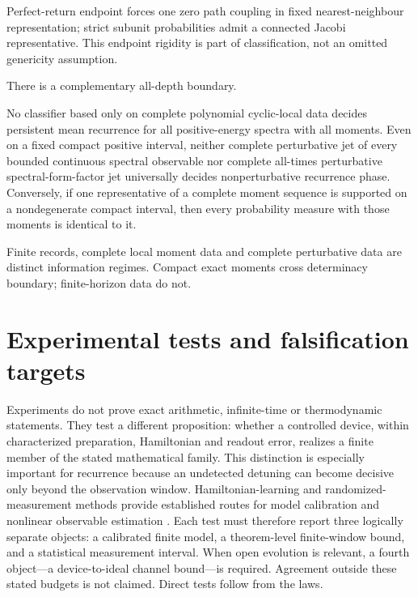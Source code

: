 Perfect-return endpoint forces one zero path coupling in fixed
nearest-neighbour representation; strict subunit probabilities admit a
connected Jacobi representative.  This endpoint rigidity is part of
classification, not an omitted genericity assumption.

There is a complementary all-depth boundary.

\begin{theorem}
\label{thm:globalcompletion}
No classifier based only on complete polynomial cyclic-local data decides
persistent mean recurrence for all positive-energy spectra with all moments.
Even on a fixed compact positive interval, neither complete perturbative jet
of every bounded continuous spectral observable nor complete all-times
perturbative spectral-form-factor jet universally decides nonperturbative
recurrence phase.  Conversely, if one representative of a complete moment
sequence is supported on a nondegenerate compact interval, then every
probability measure with those moments is identical to it.
\end{theorem}

Finite records, complete local moment data and complete perturbative data are
distinct information regimes.  Compact exact moments cross determinacy
boundary; finite-horizon data do not.

\section{Experimental tests and falsification targets}
\label{sec:experiments}

Experiments do not prove exact arithmetic, infinite-time or thermodynamic
statements.  They test a different proposition: whether a controlled device,
within characterized preparation, Hamiltonian and readout error, realizes a
finite member of the stated mathematical family.  This distinction is especially
important for recurrence because an undetected detuning can become decisive
only beyond the observation window.  Hamiltonian-learning and
randomized-measurement methods provide established routes for model
calibration and nonlinear observable estimation
\cite{WangEtAl2017,ElbenEtAl2023}.  Each test must therefore report three
logically separate objects: a calibrated finite model, a theorem-level
finite-window bound, and a statistical measurement interval.  When open
evolution is relevant, a fourth object---a device-to-ideal channel bound---is
required.  Agreement outside these stated budgets is not claimed.  Direct
tests follow from the laws.

